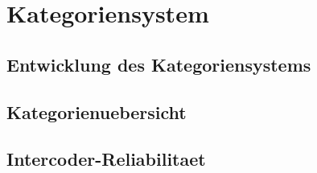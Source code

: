 \chapter{Kategoriensystem}\label{chap:kategorien}

\section{Entwicklung des Kategoriensystems}\label{sec:entwicklung}

\section{Kategorienuebersicht}\label{sec:kategorien-uebersicht}


\section{Intercoder-Reliabilitaet}\label{sec:reliabilitaet}

